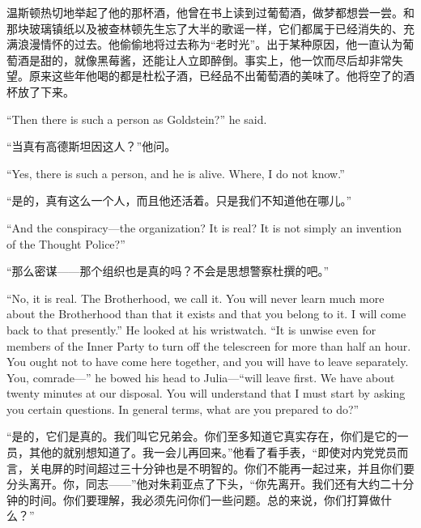 \begin{paracol}{2}
\switchcolumn

温斯顿热切地举起了他的那杯酒，他曾在书上读到过葡萄酒，做梦都想尝一尝。和那块玻璃镇纸以及被查林顿先生忘了大半的歌谣一样，它们都属于已经消失的、充满浪漫情怀的过去。他偷偷地将过去称为``老时光''。出于某种原因，他一直认为葡萄酒是甜的，就像黑莓酱，还能让人立即醉倒。事实上，他一饮而尽后却非常失望。原来这些年他喝的都是杜松子酒，已经品不出葡萄酒的美味了。他将空了的酒杯放了下来。

\switchcolumn*

``Then there is such a person as Goldstein?'' he said.

\switchcolumn

``当真有高德斯坦因这人？''他问。

\switchcolumn*

``Yes, there is such a person, and he is alive. Where, I do not know.''

\switchcolumn

``是的，真有这么一个人，而且他还活着。只是我们不知道他在哪儿。''

\switchcolumn*

``And the conspiracy---the organization? It is real? It is not simply an
invention of the Thought Police?''

\switchcolumn

``那么密谋——那个组织也是真的吗？不会是思想警察杜撰的吧。''

\switchcolumn*

``No, it is real. The Brotherhood, we call it. You will never learn much
more about the Brotherhood than that it exists and that you belong to
it. I will come back to that presently.'' He looked at his wristwatch.
``It is unwise even for members of the Inner Party to turn off the
telescreen for more than half an hour. You ought not to have come here
together, and you will have to leave separately. You, comrade---'' he
bowed his head to Julia---``will leave first. We have about twenty
minutes at our disposal. You will understand that I must start by asking
you certain questions. In general terms, what are you prepared to do?''

\switchcolumn

``是的，它们是真的。我们叫它兄弟会。你们至多知道它真实存在，你们是它的一员，其他的就别想知道了。我一会儿再回来。''他看了看手表，``即使对内党党员而言，关电屏的时间超过三十分钟也是不明智的。你们不能再一起过来，并且你们要分头离开。你，同志——''他对朱莉亚点了下头，``你先离开。我们还有大约二十分钟的时间。你们要理解，我必须先问你们一些问题。总的来说，你们打算做什么？''


\end{paracol}
